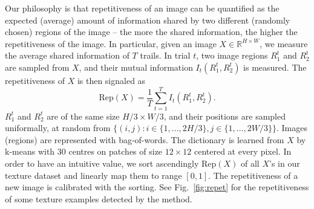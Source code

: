 Our philosophy is that repetitiveness of an image can be quantified as
the expected (average) amount of information shared by two different
(randomly chosen) regions of the image -- the more the shared
information, the higher the repetitiveness of the image. In
particular, given an image $X \in \mathbb{R}^{H\times W}$, we measure the average shared
information of $T$ trails.  In trial $t$, two image
regions $R_1^t$ and $R_2^t$ are sampled from $X$, and their mutual
information $I_t(R_1^t, R_2^t)$ is measured. The repetitiveness of $X$
is then signaled as
\begin{equation}
  \label{eq:repet}
\text{Rep}(X) = \frac{1}{T}\sum_{t=1}^T I_t(R_1^t, R_2^t).  
\end{equation}
$R_1^t$ and $R_2^t$ are of the same size $H/3 \times W/3$, and their
positions are sampled uniformally, at random from $\{(i,j): i\in\{1,
..., 2H/3\}, j\in \{1, ..., 2W/3\} \}$. Images (regions) are
represented with bag-of-words. The dictionary is learned from $X$ by
k-means with $30$ centres on patches of size $12\times 12$ centered at
every pixel. In order to have an intuitive value, we sort ascendingly
Rep$(X)$ of all $X$'s in our texture dataset and linearly map them to
range $[0, 1]$. The repetitiveness of a new image is calibrated with
the sorting. See Fig.~\ref{fig:repet} for the repetitiveness of some
texture examples detected by the method.


